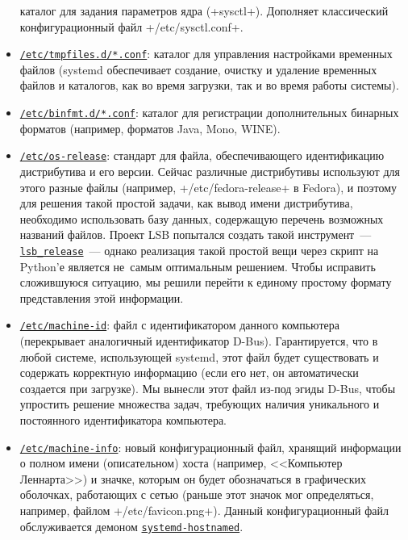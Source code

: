 \documentclass[10pt,oneside,a4paper]{article}
\newcommand{\hreftt}[2]{\href{#1}{\texttt{#2}}}
\begin{document}
\begin{itemize}
		каталог для задания параметров ядра (+sysctl+). Дополняет
		классический конфигурационный файл +/etc/sysctl.conf+.
	\item
		\hreftt{http://0pointer.de/public/systemd-man/tmpfiles.d.html}{/etc/tmpfiles.d/*.conf}:
		каталог для управления настройками временных файлов (systemd
		обеспечивает создание, очистку и удаление временных файлов и
		каталогов, как во время загрузки, так и во время работы
		системы).
	\item
		\hreftt{http://0pointer.de/public/systemd-man/binfmt.d.html}{/etc/binfmt.d/*.conf}:
		каталог для регистрации дополнительных бинарных форматов
		(например, форматов Java, Mono, WINE).
	\item
		\hreftt{http://0pointer.de/public/systemd-man/os-release.html}{/etc/os-release}:
		стандарт для файла, обеспечивающего идентификацию дистрибутива и
		его версии. Сейчас различные дистрибутивы используют для этого
		разные файлы (например, +/etc/fedora-release+ в Fedora), и
		поэтому для решения такой простой задачи, как вывод имени
		дистрибутива, необходимо использовать базу данных, содержащую
		перечень возможных названий файлов. Проект LSB попытался создать
		такой инструмент~---
		\hreftt{http://refspecs.freestandards.org/LSB_3.1.0/LSB-Core-generic/LSB-Core-generic/lsbrelease.html}{lsb\_release}~---
		однако реализация такой простой вещи через скрипт на Python'е
		является не~самым оптимальным решением. Чтобы исправить
		сложившуюся ситуацию, мы решили перейти к единому простому
		формату представления этой информации.
	\item
		\hreftt{http://0pointer.de/public/systemd-man/machine-id.html}{/etc/machine-id}:
		файл с идентификатором данного компьютера (перекрывает
		аналогичный идентификатор D-Bus). Гарантируется, что в любой
		системе, использующей systemd, этот файл будет существовать и
		содержать корректную информацию (если его нет, он автоматически
		создается при загрузке). Мы вынесли этот файл из-под эгиды
		D-Bus, чтобы упростить решение множества задач, требующих
		наличия уникального и постоянного идентификатора компьютера.
	\item
		\hreftt{http://0pointer.de/public/systemd-man/machine-info.html}{/etc/machine-info}:
		новый конфигурационный файл, хранящий информации о полном имени
		(описательном) хоста (например, <<Компьютер Леннарта>>) и
		значке, которым он будет обозначаться в графических оболочках,
		работающих с сетью (раньше этот значок мог определяться,
		например, файлом +/etc/favicon.png+). Данный конфигурационный
		файл обслуживается демоном
		\hreftt{http://www.freedesktop.org/wiki/Software/systemd/hostnamed}{systemd-hostnamed}.
\end{itemize}
\end{document}
